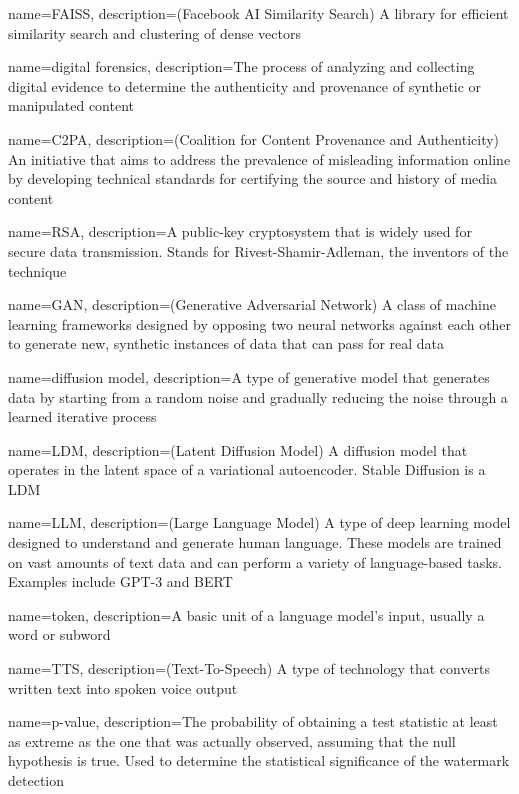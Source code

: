 {
    name={FAISS},
    description={(Facebook AI Similarity Search) A library for efficient similarity search and clustering of dense vectors}
}

{
    name={digital forensics},
    description={The process of analyzing and collecting digital evidence to determine the authenticity and provenance of synthetic or manipulated content}
}

{
    name={C2PA},
    description={(Coalition for Content Provenance and Authenticity) An initiative that aims to address the prevalence of misleading information online by developing technical standards for certifying the source and history of media content}
}

{
    name={RSA},
    description={A public-key cryptosystem that is widely used for secure data transmission. Stands for Rivest-Shamir-Adleman, the inventors of the technique}
}

{
    name={GAN},
    description={(Generative Adversarial Network) A class of machine learning frameworks designed by opposing two neural networks against each other to generate new, synthetic instances of data that can pass for real data}
}

{
    name={diffusion model},
    description={A type of generative model that generates data by starting from a random noise and gradually reducing the noise through a learned iterative process}
}

{
    name={LDM},
    description={(Latent Diffusion Model) A diffusion model that operates in the latent space of a variational autoencoder. Stable Diffusion is a LDM}
}

{
    name={LLM},
    description={(Large Language Model) A type of deep learning model designed to understand and generate human language. These models are trained on vast amounts of text data and can perform a variety of language-based tasks. Examples include GPT-3 and BERT}
}

{
    name={token},
    description={A basic unit of a language model's input, usually a word or subword}
}

{
    name={TTS},
    description={(Text-To-Speech) A type of technology that converts written text into spoken voice output}
}

{
    name={p-value},
    description={The probability of obtaining a test statistic at least as extreme as the one that was actually observed, assuming that the null hypothesis is true. Used to determine the statistical significance of the watermark detection}
}

